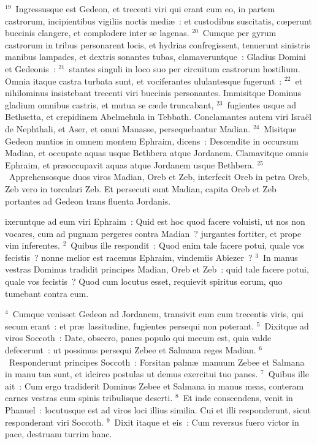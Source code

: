 ${}^{19}$~Ingressusque est Gedeon, et trecenti viri qui erant cum eo, in partem castrorum, incipientibus vigiliis noctis medi\ae~: et custodibus suscitatis, cœperunt buccinis clangere, et complodere inter se lagenas.
${}^{20}$~Cumque per gyrum castrorum in tribus personarent locis, et hydrias confregissent, tenuerunt sinistris manibus lampades, et dextris sonantes tubas, clamaveruntque~: Gladius Domini et Gedeonis~:
${}^{21}$~stantes singuli in loco suo per circuitum castrorum hostilium. Omnia itaque castra turbata sunt, et vociferantes ululantesque fugerunt~:
${}^{22}$~et nihilominus insistebant trecenti viri buccinis personantes. Immisitque Dominus gladium omnibus castris, et mutua se c\ae de truncabant,
${}^{23}$~fugientes usque ad Bethsetta, et crepidinem Abelmehula in Tebbath. Conclamantes autem viri Isra\"el de Nephthali, et Aser, et omni Manasse, persequebantur Madian.
${}^{24}$~Misitque Gedeon nuntios in omnem montem Ephraim, dicens~: Descendite in occursum Madian, et occupate aquas usque Bethbera atque Jordanem. Clamavitque omnis Ephraim, et pr\ae occupavit aquas atque Jordanem usque Bethbera.
${}^{25}$~Apprehensosque duos viros Madian, Oreb et Zeb, interfecit Oreb in petra Oreb, Zeb vero in torculari Zeb. Et persecuti sunt Madian, capita Oreb et Zeb portantes ad Gedeon trans fluenta Jordanis.

\bchapter
{}ixeruntque ad eum viri Ephraim~: Quid est hoc quod facere voluisti, ut nos non vocares, cum ad pugnam pergeres contra Madian~? jurgantes fortiter, et prope vim inferentes.
${}^{2}$~Quibus ille respondit~: Quod enim tale facere potui, quale vos fecistis~? nonne melior est racemus Ephraim, vindemiis Abiezer~?
${}^{3}$~In manus vestras Dominus tradidit principes Madian, Oreb et Zeb~: quid tale facere potui, quale vos fecistis~? Quod cum locutus esset, requievit spiritus eorum, quo tumebant contra eum.


${}^{4}$~Cumque venisset Gedeon ad Jordanem, transivit eum cum trecentis viris, qui secum erant~: et pr\ae\ lassitudine, fugientes persequi non poterant.
${}^{5}$~Dixitque ad viros Soccoth~: Date, obsecro, panes populo qui mecum est, quia valde defecerunt~: ut possimus persequi Zebee et Salmana reges Madian.
${}^{6}$~Responderunt principes Soccoth~: Forsitan palm\ae\ manuum Zebee et Salmana in manu tua sunt, et idcirco postulas ut demus exercitui tuo panes.
${}^{7}$~Quibus ille ait~: Cum ergo tradiderit Dominus Zebee et Salmana in manus meas, conteram carnes vestras cum spinis tribulisque deserti.
${}^{8}$~Et inde conscendens, venit in Phanuel~: locutusque est ad viros loci illius similia. Cui et illi responderunt, sicut responderant viri Soccoth.
${}^{9}$~Dixit itaque et eis~: Cum reversus fuero victor in pace, destruam turrim hanc.


